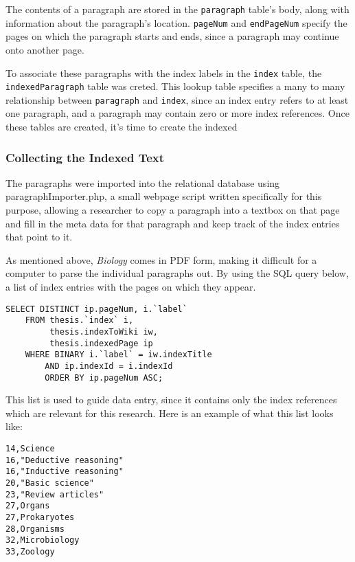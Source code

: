 The contents of a paragraph are stored in the {\tt paragraph} table's body, along with information about the paragraph's location.
{\tt pageNum} and {\tt endPageNum} specify the pages on which the paragraph starts and ends, since a paragraph may continue onto another page.

To associate these paragraphs with the index labels in the {\tt index} table, the {\tt indexedParagraph} table was creted.
This lookup table specifies a many to many relationship between {\tt paragraph} and {\tt index}, since an index entry refers to at least one paragraph, and a paragraph may contain zero or more index references. Once these tables are created, it's time to create the indexed

\subsubsection{Collecting the Indexed Text}

The paragraphs were imported into the relational database using paragraphImporter.php, a small webpage script written specifically for this purpose, allowing a researcher to copy a paragraph into a textbox on that page and fill in the meta data for that paragraph and keep track of the index entries that point to it.

As mentioned above, {\it Biology} comes in PDF form, making it difficult for a computer to parse the individual paragraphs out.
By using the SQL query below, a list of index entries with the pages on which they appear.

\begin{lstlisting}
SELECT DISTINCT ip.pageNum, i.`label`
    FROM thesis.`index` i,
         thesis.indexToWiki iw,
         thesis.indexedPage ip
    WHERE BINARY i.`label` = iw.indexTitle
        AND ip.indexId = i.indexId
        ORDER BY ip.pageNum ASC;
\end{lstlisting}

This list is used to guide data entry, since it contains only the index references which are relevant for this research.
Here is an example of what this list looks like:

\begin{multicols}{2}
\begin{verbatim}
14,Science
16,"Deductive reasoning"
16,"Inductive reasoning"
20,"Basic science"
23,"Review articles"
27,Organs
27,Prokaryotes
28,Organisms
32,Microbiology
33,Zoology
\end{verbatim}
\end{multicols}

